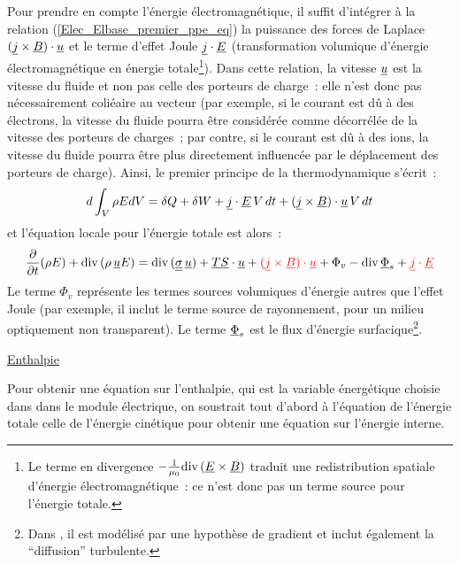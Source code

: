 Pour prendre en compte l'\'energie \'electromagn\'etique, il suffit d'int\'egrer
\`a la relation (\ref{Elec_Elbase_premier_ppe_eq}) la puissance des forces de Laplace $(\underline{j} \times
\underline{B})\cdot\underline{u}$ et le terme d'effet Joule $\underline{j}\cdot\underline{E}$
(transformation volumique d'\'energie \'electromagn\'etique en \'energie
totale\footnote{Le terme en divergence
$-\frac{1}{\mu_0}\text{div}\,(\underline{E}\times\underline{B})$
traduit une redistribution spatiale d'\'energie \'electromagn\'etique~:
ce n'est donc pas un terme source pour l'\'energie totale.}).
Dans cette relation, la vitesse $\underline{u}$ est la vitesse du fluide et non pas
celle des porteurs de charge~: elle n'est donc pas n\'ecessairement coli\'eaire
au vecteur  (par exemple, si le courant est d\^u \`a des \'electrons,
la vitesse du fluide pourra \^etre consid\'er\'ee comme d\'ecorr\'el\'ee de la
vitesse des porteurs de charges~; par contre, si le courant est d\^u \`a des ions,
la vitesse du fluide pourra \^etre plus directement influenc\'ee par
le d\'eplacement des porteurs de charge).
Ainsi, le premier principe de la thermodynamique s'\'ecrit~:
\begin{equation}
d\int_V \rho E dV=\delta Q+\delta W+\underline{j}\cdot\underline{E}\,V\,dt +(\underline{j} \times
\underline{B})\cdot\underline{u}\,V\,dt
\end{equation}
et l'\'equation locale pour l'\'energie totale est alors~:
\begin{equation}
\displaystyle\frac{\partial}{\partial t}(\rho E)
+\text{div}\,(\rho\, \underline{u} E)
=\text{div}\,(\underline{\underline{\sigma}}\,\underline{u}) + \underline{TS}\cdot\underline{u} + {\color{red}(\underline{j} \times
\underline{B})\cdot\underline{u}} + \Phi_v - \text{div}\,{\underline{\Phi}_s} + {\color{red}\underline{j}\cdot \underline{E}}
\end{equation}
Le terme $\Phi_v$ repr\'esente les termes sources volumiques d'\'energie
autres que l'effet Joule (par exemple, il inclut le terme source de
rayonnement, pour un milieu optiquement non transparent). Le terme $\underline{\Phi}_s$ est
le flux d'\'energie surfacique\footnote{Dans \CS, il est mod\'elis\'e par
une hypoth\`ese de gradient et inclut également la ``diffusion'' turbulente.}.

\underline{Enthalpie}
\nopagebreak

Pour obtenir une \'equation sur l'enthalpie, qui est la variable \'energ\'etique
choisie dans \CS dans le module \'electrique, on
soustrait tout d'abord \`a l'\'equation de l'\'energie totale celle de l'\'energie
cin\'etique pour obtenir une \'equation sur l'\'energie interne.

